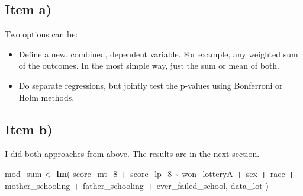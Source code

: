 \documentclass[
]{article}
\newenvironment{Shaded}{\begin{snugshade}}{\end{snugshade}}
\newcommand{\FunctionTok}[1]{\textcolor[rgb]{0.13,0.29,0.53}{\textbf{#1}}}
\newcommand{\NormalTok}[1]{#1}
\newcommand{\OtherTok}[1]{\textcolor[rgb]{0.56,0.35,0.01}{#1}}
\newcommand{\SpecialCharTok}[1]{\textcolor[rgb]{0.81,0.36,0.00}{\textbf{#1}}}
\providecommand{\tightlist}{%
  \setlength{\itemsep}{0pt}\setlength{\parskip}{0pt}}
\begin{document}
\subsection{Item a)}\label{item-a-1}

Two options can be:

\begin{itemize}
\tightlist
\item
  Define a new, combined, dependent variable. For example, any weighted
  sum of the outcomes. In the most simple way, just the sum or mean of
  both.
\item
  Do separate regressions, but jointly test the p-values using
  Bonferroni or Holm methods.
\end{itemize}

\subsection{Item b)}\label{item-b-1}

I did both approaches from above. The results are in the next section.

\begin{Shaded}
\begin{Highlighting}[]
\NormalTok{mod\_sum }\OtherTok{\textless{}{-}} \FunctionTok{lm}\NormalTok{(}
\NormalTok{  score\_mt\_8 }\SpecialCharTok{+}\NormalTok{ score\_lp\_8 }\SpecialCharTok{\textasciitilde{}}\NormalTok{ won\_lotteryA }\SpecialCharTok{+}\NormalTok{ sex }\SpecialCharTok{+}\NormalTok{ race }\SpecialCharTok{+}\NormalTok{ mother\_schooling }\SpecialCharTok{+}
\NormalTok{    father\_schooling }\SpecialCharTok{+}\NormalTok{ ever\_failed\_school,}
\NormalTok{  data\_lot}
\NormalTok{)}
\end{Highlighting}
\end{Shaded}
\end{document}
